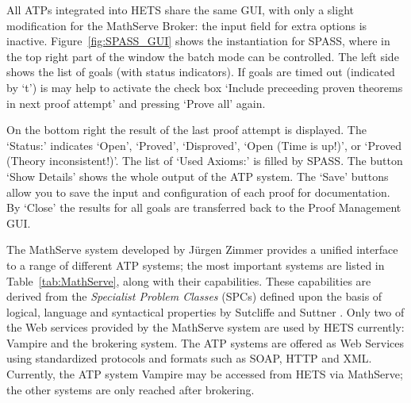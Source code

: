 \documentclass{article}
\newcommand{\normalTEXTSC}[2]{{#1\scriptsize#2}}
\newcommand     {\Hets}{\normalTEXTSC{H}{ETS}\xspace}
\newcommand     {\SPASS}{\normalTEXTSC{S}{PASS}\xspace}
\begin{document}
All ATPs integrated into \Hets share the same GUI, with only a slight
modification for the MathServe Broker: the input field for extra options is
inactive. Figure~\ref{fig:SPASS_GUI} shows the instantiation for \SPASS, where
in the top right part of the window the batch mode can be controlled.  The
left side shows the list of goals (with status indicators).  If goals are
timed out (indicated by `t') is may help to activate the check box `Include
preceeding proven theorems in next proof attempt' and pressing `Prove all'
again.

On the bottom right the result of the last proof
attempt is displayed.  The `Status:' indicates `Open', `Proved', `Disproved',
`Open (Time is up!)', or `Proved (Theory inconsistent!)'. The list of `Used
Axioms:' is filled by \SPASS. The button `Show Details' shows the whole output
of the ATP system. The `Save' buttons allow you to save the input and
configuration of each proof for documentation. By `Close' the results for all
goals are transferred back to the Proof Management GUI.

The MathServe system \cite{ZimmerAutexier06} developed by J\"{u}rgen
Zimmer provides a unified interface to a range of different ATP
systems; the most important systems are listed in
Table~\ref{tab:MathServe}, along with their capabilities. These
capabilities are derived from the \emph{Specialist Problem Classes}
(SPCs) defined upon the basis of logical, language and syntactical
properties by Sutcliffe and Suttner \cite{SutcliffeEA:2001:EvalATP}.
Only two of the Web services provided by the MathServe system are used
by \Hets currently: Vampire and the brokering system.  The ATP systems
are offered as Web Services using standardized protocols and formats
such as SOAP, HTTP and XML.  Currently, the ATP system Vampire may be
accessed from \Hets via MathServe; the other systems are only reached
after brokering.
\end{document}
